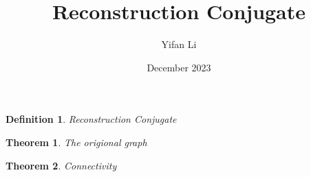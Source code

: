 \documentclass{article}
\title{\vspace{-2cm} Reconstruction Conjugate}
\author{Yifan Li}
\date{December 2023}
\newtheorem{definition}{Definition}
\newtheorem{theorem}{\bf Theorem}
\begin{document}
\maketitle

\begin{definition}
    Reconstruction Conjugate

    
\end{definition}


\begin{theorem}
    The origional graph
\end{theorem}

\begin{theorem}
    Connectivity
\end{theorem}
\end{document}
